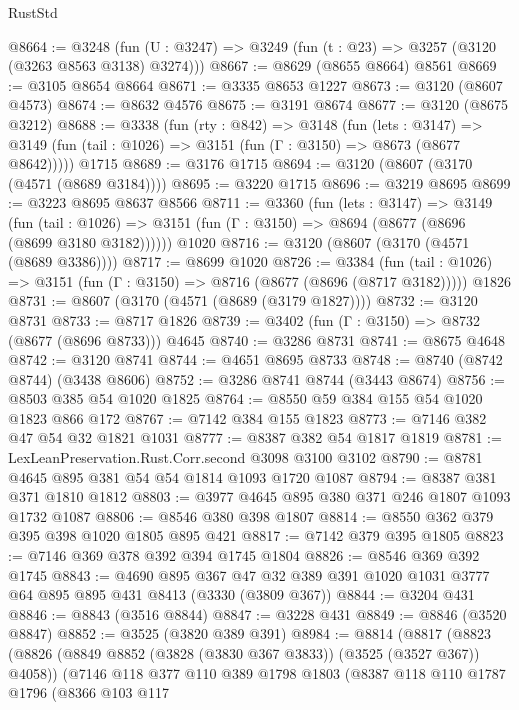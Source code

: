 \begin{lexlean}{RustStd}
\begin{coremodule}
{\begin{coremodule}
{{{{{{{{{{{{{{{{{{{{{{{{{{@8664 := @3248 (fun (U : @3247) => @3249 (fun (t : @23) => @3257 (@3120 (@3263 @8563 @3138) @3274)))
@8667 := @8629 (@8655 @8664) @8561
@8669 := @3105 @8654 @8664
@8671 := @3335 @8653 @1227
@8673 := @3120 (@8607 @4573)
@8674 := @8632 @4576
@8675 := @3191 @8674
@8677 := @3120 (@8675 @3212)
@8688 := @3338
    (fun (rty : @842) =>
    @3148
      (fun (lets : @3147) =>
      @3149 (fun (tail : @1026) => @3151 (fun (Γ : @3150) => @8673 (@8677 @8642)))))
    @1715
@8689 := @3176 @1715
@8694 := @3120 (@8607 (@3170 (@4571 (@8689 @3184))))
@8695 := @3220 @1715
@8696 := @3219 @8695
@8699 := @3223 @8695 @8637 @8566
@8711 := @3360
    (fun (lets : @3147) =>
    @3149
      (fun (tail : @1026) => @3151 (fun (Γ : @3150) => @8694 (@8677 (@8696 (@8699 @3180 @3182))))))
    @1020
@8716 := @3120 (@8607 (@3170 (@4571 (@8689 @3386))))
@8717 := @8699 @1020
@8726 := @3384
    (fun (tail : @1026) => @3151 (fun (Γ : @3150) => @8716 (@8677 (@8696 (@8717 @3182)))))
    @1826
@8731 := @8607 (@3170 (@4571 (@8689 (@3179 @1827))))
@8732 := @3120 @8731
@8733 := @8717 @1826
@8739 := @3402 (fun (Γ : @3150) => @8732 (@8677 (@8696 @8733))) @4645
@8740 := @3286 @8731
@8741 := @8675 @4648
@8742 := @3120 @8741
@8744 := @4651 @8695 @8733
@8748 := @8740 (@8742 @8744) (@3438 @8606)
@8752 := @3286 @8741 @8744 (@3443 @8674)
@8756 := @8503 @385 @54 @1020 @1825
@8764 := @8550 @59 @384 @155 @54 @1020 @1823 @866 @172
@8767 := @7142 @384 @155 @1823
@8773 := @7146 @382 @47 @54 @32 @1821 @1031
@8777 := @8387 @382 @54 @1817 @1819
@8781 := LexLeanPreservation.Rust.Corr.second @3098 @3100 @3102
@8790 := @8781 @4645 @895 @381 @54 @54 @1814 @1093 @1720 @1087
@8794 := @8387 @381 @371 @1810 @1812
@8803 := @3977 @4645 @895 @380 @371 @246 @1807 @1093 @1732 @1087
@8806 := @8546 @380 @398 @1807
@8814 := @8550 @362 @379 @395 @398 @1020 @1805 @895 @421
@8817 := @7142 @379 @395 @1805
@8823 := @7146 @369 @378 @392 @394 @1745 @1804
@8826 := @8546 @369 @392 @1745
@8843 := @4690
    @895
    @367
    @47
    @32
    @389
    @391
    @1020
    @1031
    @3777
    @64
    @895
    @895
    @431
    @8413
    (@3330 (@3809 @367))
@8844 := @3204 @431
@8846 := @8843 (@3516 @8844)
@8847 := @3228 @431
@8849 := @8846 (@3520 @8847)
@8852 := @3525 (@3820 @389 @391)
@8984 := @8814
    (@8817
      (@8823
        (@8826 (@8849 @8852 (@3828 (@3830 @367 @3833)) (@3525 (@3527 @367)) @4058))
        (@7146
          @118
          @377
          @110
          @389
          @1798
          @1803
          (@8387
            @118
            @110
            @1787
            @1796
            (@8366
              @103
              @117
}}}}}}}}}}}}}}}}}}}}}}}}}}
\end{coremodule}}
\end{coremodule}
\end{lexlean}
